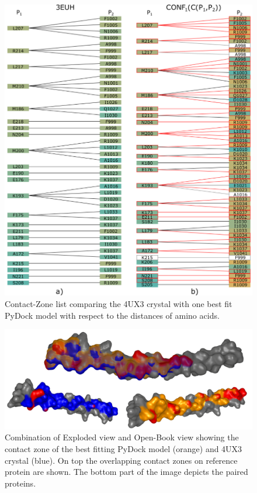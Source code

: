 \documentclass{bmcart}
\def\OpBook {Open-Book view\xspace}
\def\ExpView {Exploded view\xspace}
\def\CoZoList{Contact-Zone list\xspace}
\begin{document}
\begin{backmatter}
\begin{figure}[h!]
    \centering
  \includegraphics[width=\columnwidth]{images/figure13.pdf}
    \caption{ \CoZoList comparing the 4UX3 crystal with one best fit PyDock model with respect to the distances of amino acids.}
  \label{fig:coiled2}
\end{figure}

\begin{figure}[!h]
  \centering
  \includegraphics[width=\columnwidth]{images/figure14.png}
  \caption{ Combination of \ExpView and \OpBook showing the contact zone of the best fitting PyDock model (orange) and 4UX3 crystal (blue). On top the overlapping contact zones on reference protein are shown. The bottom part of the image depicts the paired proteins.}
  \label{fig:selection_4_final_SMC3_PyDock}
\end{figure}


\end{backmatter}
\end{document}
